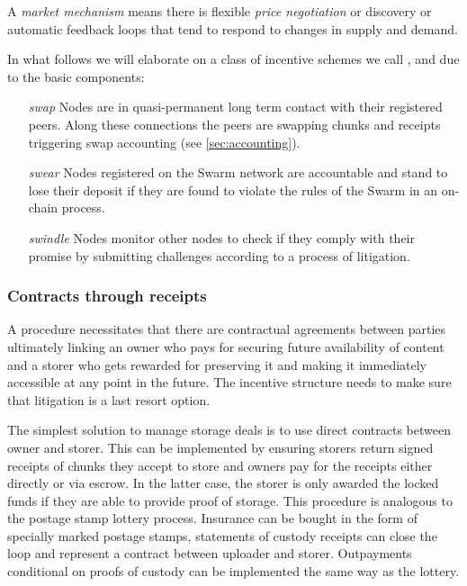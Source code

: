 A \emph{market mechanism} means there is flexible \emph{price negotiation} or discovery or automatic feedback loops that tend to respond to changes in supply and demand.

In what follows we will elaborate on a class of incentive schemes we call ,  and  due to the basic components:

\begin{itemize}
\item [\emph{swap}]
  Nodes are in quasi-permanent long term contact with their registered peers. Along these connections the peers are swapping chunks and receipts triggering swap accounting (see \ref{sec:accounting}).
  
\item [\emph{swear}]
  Nodes registered on the Swarm network are accountable and stand to lose their deposit if they are found to violate the rules of the Swarm in an on-chain  process.

\item [\emph{swindle}]
  Nodes monitor other nodes to check if they comply with their promise by submitting challenges according to a process of litigation.

\end{itemize}

\subsubsection{Contracts through receipts}

A  procedure necessitates that there are contractual agreements between parties ultimately linking an owner who pays for securing future availability of content and a storer who gets rewarded for preserving it and making it immediately accessible at any point in the future. The incentive structure needs to make sure that litigation is a last resort option.

The simplest solution to manage storage deals is to use direct contracts between owner and storer. This can be implemented by ensuring storers return signed receipts of chunks they accept to store and owners pay for the receipts either directly or via escrow. In the latter case, the storer is only awarded the locked funds if they are able to provide proof of storage. This procedure is analogous to the postage stamp lottery process. Insurance can be bought in the form of specially marked postage stamps, statements of custody receipts can close the loop and represent a contract between uploader and storer. Outpayments conditional on proofs of custody can be implemented the same way as the lottery.

